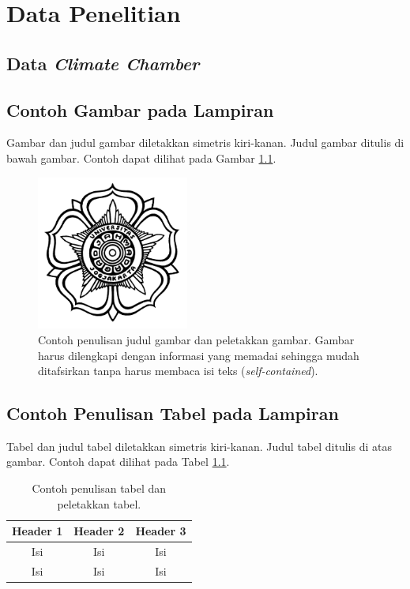 \chapter{Data Penelitian}

\section{Data \textit{Climate Chamber}}


\section{Contoh Gambar pada Lampiran}
Gambar dan judul gambar diletakkan simetris kiri-kanan. Judul gambar ditulis di bawah
gambar. Contoh dapat dilihat pada Gambar \ref{fig:a}.

\begin{figure}[!h]
    \centering
    \includegraphics[width=5cm]{logoUGM.jpg}
    \caption{Contoh penulisan judul gambar dan peletakkan gambar. Gambar harus dilengkapi
dengan informasi yang memadai sehingga mudah ditafsirkan tanpa harus membaca
isi teks (\textit{self-contained}).}
    \label{fig:a}
\end{figure}

\section{Contoh Penulisan Tabel pada Lampiran}
Tabel dan judul tabel diletakkan simetris kiri-kanan. Judul tabel ditulis di atas gambar.
Contoh dapat dilihat pada Tabel \ref{tbl:b}.

\begin{table}[!h]
    \caption{Contoh penulisan tabel dan peletakkan tabel.}
    \label{tbl:b}
    \centering
\begin{tabular}{|c|c|c|}
\hline
Header 1 & Header 2 & Header 3 \\ 
\hline
Isi & Isi & Isi \\ 
\hline
Isi & Isi & Isi \\
\hline
\end{tabular}
\end{table}

